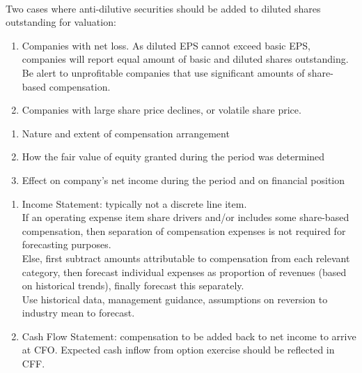 \begin{remark} \\
Two cases where anti-dilutive securities should be added to diluted shares outstanding for valuation:
\begin{enumerate}[label=\roman*.]
\setlength{\itemsep}{0pt}
\item Companies with net loss. As diluted EPS cannot exceed basic EPS, companies will report equal amount of basic and diluted shares outstanding. Be alert to unprofitable companies that use significant amounts of share-based compensation.
\item Companies with large share price declines, or volatile share price.
\end{enumerate}
\end{remark}

\begin{remark} 
\begin{enumerate}[label=\roman*.]
\setlength{\itemsep}{0pt}
\item Nature and extent of compensation arrangement
\item How the fair value of equity granted during the period was determined
\item Effect on company's net income during the period and on financial position
\end{enumerate}
\end{remark}

\begin{remark} 
\begin{enumerate}[label=\roman*.]
\setlength{\itemsep}{0pt}
\item Income Statement: typically not a discrete line item.\\
If an operating expense item share drivers and/or includes some share-based compensation, then separation of compensation expenses is not required for forecasting purposes.\\
Else, first subtract amounts attributable to compensation from each relevant category, then forecast individual expenses as proportion of revenues (based on historical trends), finally forecast this separately.\\
Use historical data, management guidance, assumptions on reversion to industry mean to forecast.
\item Cash Flow Statement: compensation to be added back to net income to arrive at CFO. Expected cash inflow from option exercise should be reflected in CFF.
\end{enumerate}
\end{remark}

